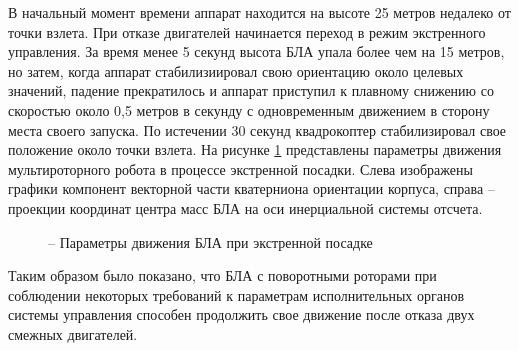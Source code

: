 В начальный момент времени аппарат находится на высоте 25 метров недалеко от точки взлета.
При отказе двигателей начинается переход в режим экстренного управления.
За время менее 5 секунд высота БЛА упала более чем на 15 метров, но затем, когда аппарат стабилизиировал свою ориентацию около целевых значений, падение прекратилось и аппарат приступил к плавному снижению со скоростью около 0,5 метров в секунду с одновременным движением в сторону места своего запуска. По истечении 30 секунд квадрокоптер стабилизировал свое положение около точки взлета. На рисунке \ref{fig:em_coords} представлены параметры движения мультироторного робота в процессе экстренной посадки. Слева изображены графики компонент векторной части кватерниона ориентации корпуса, справа -- проекции координат центра масс БЛА на оси инерциальной системы отсчета.
\begin{figure}[H]
	
	\centering
	\hfil
	\subfloat[коордиата x]{\texttt{[image: em/x]}}
	
	 \hfil 
	\subfloat[коордиата y]{\texttt{[image: em/y]}}  
	
	\hfil
	\subfloat[коордиата z]{\texttt{[image: em/z]}}
	\caption{ -- Параметры движения БЛА при экстренной посадке}
	\label{fig:em_coords}
\end{figure}

Таким образом было показано, что БЛА с поворотными роторами при соблюдении некоторых требований к параметрам исполнительных органов системы управления способен продолжить свое движение после отказа двух смежных двигателей.